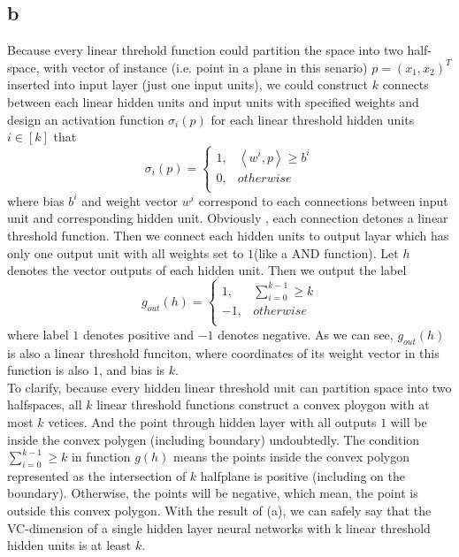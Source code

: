 \documentclass{article}
\begin{document}
	\subsection{b}
	Because every linear threhold function could partition the space into two half-space, with vector of instance (i.e. point in a plane in this senario) $p = (x_1,x_2)^{T}$ inserted into input layer (just one input units), we could construct $k$ connects between each linear hidden units and input units with specified weights and design an activation function $\sigma_i(p)$ for each linear threshold hidden units $i \in [k]$ that
	$$
	\sigma_i(p)= 
	\begin{cases}
	1, &\left<w^i,p\right> \geq b^i\\
	0, &otherwise\\
	\end{cases}
	$$
	where bias $b^i$ and weight vector $w^i$ correspond to each connections between input unit and corresponding hidden unit. Obviously , each connection detones a linear threshold function.
	Then we connect each hidden units to output layar which has only one output unit with all weights set to $1$(like a AND function). Let $h$ denotes the vector outputs of each hidden unit. Then we output the label
	$$
	g_{out}(h)=
	\begin{cases}
	1, &\sum_{i=0}^{k-1} \geq k\\
	-1, &otherwise\\
	\end{cases}
	$$
	where label $1$ denotes positive and $-1$ denotes negative. As we can see, $g_{out}(h)$ is also a linear threshold funciton, where coordinates of its weight vector in this function is also $1$, and bias is $k$.\\
	To clarify, because every hidden linear threshold unit can partition space into two halfspaces, all $k$ linear threshold functions construct a convex ploygon with at most $k$ vetices. And the point through hidden layer with all outputs $1$ will be inside the convex polygen (including boundary) undoubtedly. The condition $\sum_{i=0}^{k-1} \geq k$ in function $g(h)$ means the points inside the convex polygon represented as the intersection of $k$ halfplane is positive (including on the boundary). Otherwise, the points will be negative, which mean, the point is outside this convex polygon. With the result of (a), we can safely say that the VC-dimension of a single hidden layer neural networks with k linear threshold hidden units is at least $k$.
\end{document}
